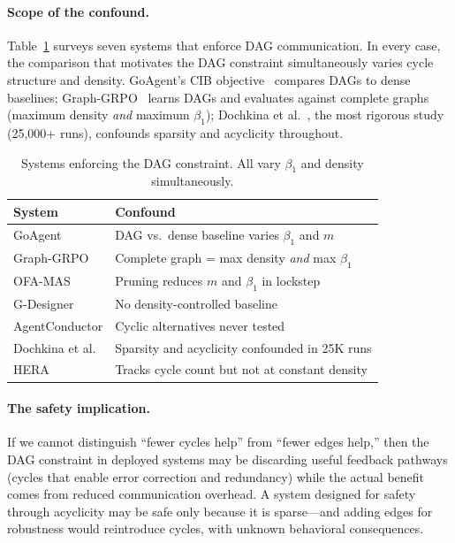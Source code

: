 \documentclass[10pt,twocolumn]{article}
\begin{document}
\paragraph{Scope of the confound.}
Table~\ref{tab:confound} surveys seven systems that enforce DAG
communication. In every case, the comparison that motivates the DAG
constraint simultaneously varies cycle structure and density. GoAgent's
CIB objective~\citep{goagent2026} compares DAGs to dense baselines;
Graph-GRPO~\citep{graphgrpo2026} learns DAGs and evaluates against
complete graphs (maximum density \emph{and} maximum $\beta_1$); Dochkina
et al.~\citep{dochkina2026}, the most rigorous study (25,000+ runs),
confounds sparsity and acyclicity throughout.

\begin{table}[t]
\centering
\caption{Systems enforcing the DAG constraint. All vary $\beta_1$ and
density simultaneously.}
\label{tab:confound}
\small
\begin{tabular}{lp{4.8cm}}
\toprule
\textbf{System} & \textbf{Confound} \\
\midrule
GoAgent & DAG vs.\ dense baseline varies $\beta_1$ and $m$ \\
Graph-GRPO & Complete graph = max density \emph{and} max $\beta_1$ \\
OFA-MAS & Pruning reduces $m$ and $\beta_1$ in lockstep \\
G-Designer & No density-controlled baseline \\
AgentConductor & Cyclic alternatives never tested \\
Dochkina et al. & Sparsity and acyclicity confounded in 25K runs \\
HERA & Tracks cycle count but not at constant density \\
\bottomrule
\end{tabular}
\end{table}

\paragraph{The safety implication.}
If we cannot distinguish ``fewer cycles help'' from ``fewer edges help,''
then the DAG constraint in deployed systems may be discarding useful
feedback pathways (cycles that enable error correction and redundancy) while
the actual benefit comes from reduced communication overhead. A system
designed for safety through acyclicity may be safe only because it is
sparse---and adding edges for robustness would reintroduce cycles, with
unknown behavioral consequences.
\end{document}
